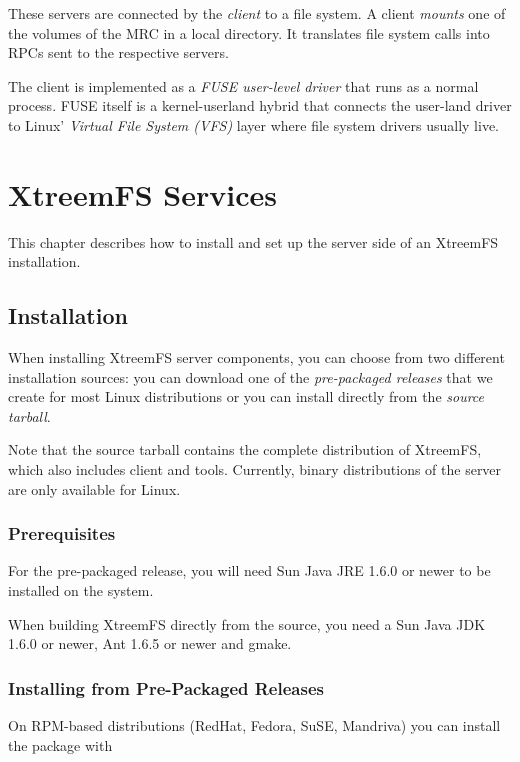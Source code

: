 \documentclass[a4paper,10pt]{book}
\begin{document}
These servers are connected by the \emph{client} to a file system. A client \emph{mounts} one of the volumes of the MRC in a local directory. It translates file system calls into RPCs sent to the respective servers.

The client is implemented as a \emph{FUSE user-level driver} that runs as a normal process. FUSE itself is a kernel-userland hybrid that connects the user-land driver to Linux' \emph{Virtual File System (VFS)} layer where file system drivers usually live.


\chapter{XtreemFS Services}

This chapter describes how to install and set up the server side of an XtreemFS installation.

\section{Installation}

When installing XtreemFS server components, you can choose from two different installation sources: you can download one of the \emph{pre-packaged releases} that we create for most Linux distributions or you can install directly from the \emph{source tarball}.

Note that the source tarball contains the complete distribution of XtreemFS, which also includes client and tools. Currently, binary distributions of the server are only available for Linux.

\subsection{Prerequisites}

For the pre-packaged release, you will need Sun Java JRE 1.6.0 or newer to be installed on the system.

When building XtreemFS directly from the source, you need a Sun Java JDK 1.6.0 or newer, Ant 1.6.5 or newer and gmake.

\subsection{Installing from Pre-Packaged Releases}

On RPM-based distributions (RedHat, Fedora, SuSE, Mandriva) you can install the package with
\end{document}
